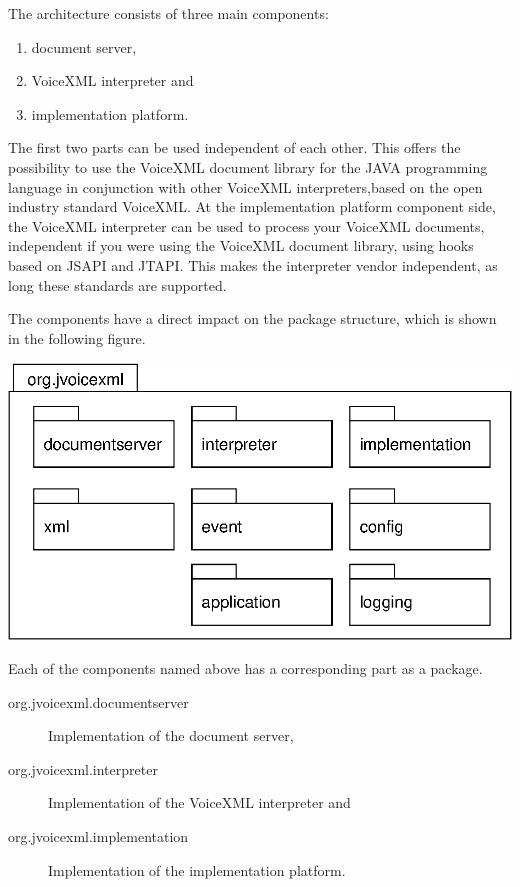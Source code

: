 \documentclass[11pt,a4paper]{article}
\begin{document}
The architecture consists of three main components:
\begin{enumerate}
\item document server,
\item VoiceXML interpreter and
\item implementation platform.
\end{enumerate}

The first two parts can be used independent of each other. 
This offers the possibility
to use the VoiceXML document library for the JAVA programming language 
in conjunction with other VoiceXML interpreters,based on the open
industry standard VoiceXML.
At the implementation platform component side, the VoiceXML interpreter can be
used to process your VoiceXML documents, independent if you were using the 
VoiceXML document library, using hooks based on JSAPI and JTAPI.
This makes the interpreter vendor independent, as long these standards
are supported.

The components have a direct impact on the package structure, which is shown
in the following figure.

\begin{center}
\includegraphics{package-org.jvoicexml.eps}
\end{center}

Each of the components named above has a
corresponding part as a package. 
\begin{description}
\item[org.jvoicexml.documentserver] Implementation of the document server,
\item[org.jvoicexml.interpreter] Implementation of the VoiceXML interpreter and
\item[org.jvoicexml.implementation] Implementation of the implementation 
platform.
\end{description}
\end{document}
